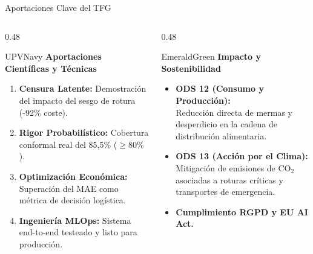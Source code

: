 \documentclass[aspectratio=169, 10pt]{beamer}
\begin{document}
\begin{frame}{Aportaciones Clave del TFG}
  \begin{columns}[T]
    \begin{column}{0.48\textwidth}
      \begin{metriccard}{UPVNavy}
        \textbf{\textcolor{UPVNavy}{Aportaciones Científicas y Técnicas}}
        \begin{enumerate}\small
          \item \textbf{Censura Latente:} Demostración del impacto del sesgo de rotura (-92\% coste).
          \item \textbf{Rigor Probabilístico:} Cobertura conformal real del 85,5\% ($\ge 80\%$).
          \item \textbf{Optimización Económica:} Superación del MAE como métrica de decisión logística.
          \item \textbf{Ingeniería MLOps:} Sistema end-to-end testeado y listo para producción.
        \end{enumerate}
      \end{metriccard}
    \end{column}
    \begin{column}{0.48\textwidth}
      \begin{metriccard}{EmeraldGreen}
        \textbf{\textcolor{EmeraldGreen}{Impacto y Sostenibilidad}}
        \begin{itemize}\small
          \item \textbf{ODS 12 (Consumo y Producción):}\\
          Reducción directa de mermas y desperdicio en la cadena de distribución alimentaria.
          \item \textbf{ODS 13 (Acción por el Clima):}\\
          Mitigación de emisiones de CO$_2$ asociadas a roturas críticas y transportes de emergencia.
          \item \textbf{Cumplimiento RGPD y EU AI Act.}
        \end{itemize}
      \end{metriccard}
    \end{column}
  \end{columns}
\end{frame}
\end{document}
